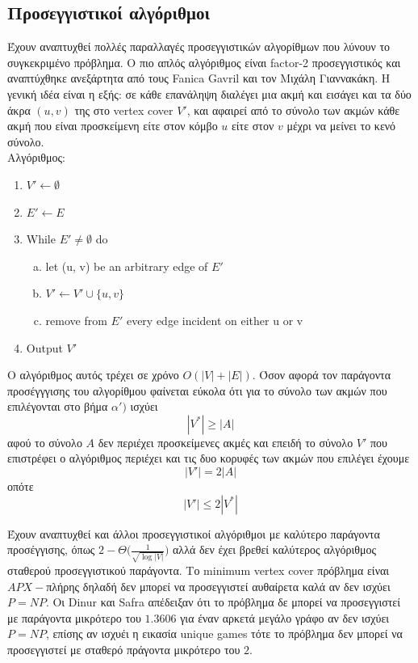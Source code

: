 \subsection{Προσεγγιστικοί αλγόριθμοι} 

Έχουν αναπτυχθεί πολλές παραλλαγές προσεγγιστικών αλγορίθμων που λύνουν το συγκεκριμένο πρόβλημα. Ο πιο απλός αλγόριθμος είναι factor-2  προσεγγιστικός και αναπτύχθηκε ανεξάρτητα από τους Fanica Gavril και τον Μιχάλη Γιαννακάκη. Η γενική ιδέα είναι η εξής: σε κάθε επανάληψη διαλέγει μια ακμή και εισάγει και τα δύο άκρα $(u, v)$ της στο vertex cover $V'$, και αφαιρεί από το σύνολο των ακμών κάθε ακμή που είναι προσκείμενη είτε στον κόμβο $u$ είτε στον $v$ μέχρι να μείνει το κενό σύνολο.\\
Αλγόριθμος:
\begin{enumerate}
\item $ V' \leftarrow \emptyset $
\item $ E' \leftarrow E$
\item While $ E' \neq {\emptyset} $ do
\begin{enumerate}[a)]
\item let (u, v) be an arbitrary edge of $E'$
\item $V' \leftarrow V' \cup \{u,v\}$
\item remove from $E'$ every edge incident on either u or v 
\end{enumerate}
\item Output $V'$
\end{enumerate}

Ο αλγόριθμος αυτός τρέχει σε χρόνο $O(|V| + |E|)$\cite{IntAlg}. Όσον αφορά τον παράγοντα προσέγγγισης του αλγορίθμου φαίνεται εύκολα ότι για το σύνολο των ακμών που επιλέγονται στο βήμα $\alpha')$ ισχύει 
$$|V^{*}| \geq |A|$$ 
αφού το σύνολο $A$ δεν περιέχει προσκείμενες ακμές και επειδή το σύνολο $V'$ που επιστρέφει ο αλγόριθμος περιέχει και τις δυο κορυφές των ακμών που επιλέγει έχουμε 
$$|V'| = 2|A|$$ 
οπότε 
$$|V'| \leq 2|V^{*}|$$ 

Έχουν αναπτυχθεί και άλλοι προσεγγιστικοί αλγόριθμοι με καλύτερο παράγοντα προσέγγισης, όπως $2-\Theta\Big(\frac{1}{\sqrt{\log{|V|}}}\Big)$\cite{BetterAppr} αλλά δεν έχει βρεθεί καλύτερος αλγόριθμος σταθερού προσεγγιστικού παράγοντα. Το minimum vertex cover πρόβλημα είναι $APX-$πλήρης δηλαδή δεν μπορεί να προσεγγιστεί αυθαίρετα καλά αν δεν ισχύει $P=NP$. Οι Dinur και Safra απέδειξαν ότι το πρόβλημα δε μπορεί να προσεγγιστεί με παράγοντα μικρότερο του $1.3606$ για έναν αρκετά μεγάλο γράφο αν δεν ισχύει $P=NP$, επίσης αν ισχυέι η εικασία unique games τότε το πρόβλημα δεν μπορεί να προσεγγιστεί με σταθερό πράγοντα μικρότερο του $2$.